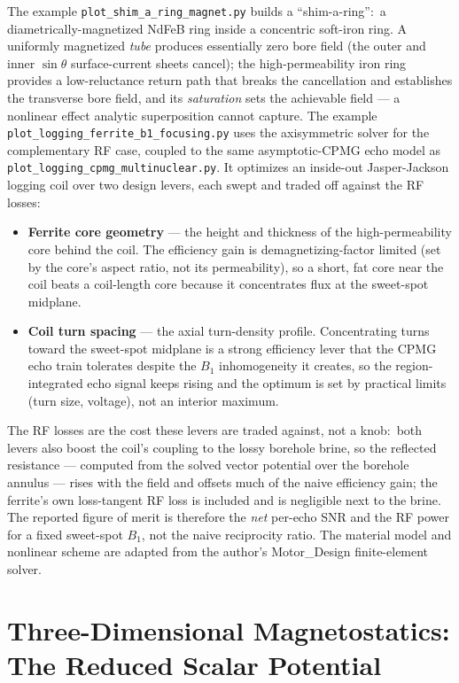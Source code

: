 \documentclass[11pt,oneside]{report}
\newcommand{\code}[1]{\texttt{#1}}
\begin{document}
The example \code{plot\_shim\_a\_ring\_magnet.py} builds a ``shim-a-ring'':\ a
diametrically-magnetized NdFeB ring inside a concentric soft-iron ring. A
uniformly magnetized \emph{tube} produces essentially zero bore field (the outer
and inner \(\sin\theta\) surface-current sheets cancel); the high-permeability
iron ring provides a low-reluctance return path that breaks the cancellation and
establishes the transverse bore field, and its \emph{saturation} sets the
achievable field --- a nonlinear effect analytic superposition cannot capture.
The example \code{plot\_logging\_ferrite\_b1\_focusing.py} uses the axisymmetric
solver for the complementary RF case, coupled to the same asymptotic-CPMG echo
model as \code{plot\_logging\_cpmg\_multinuclear.py}. It optimizes an inside-out
Jasper-Jackson logging coil over two design levers, each swept and traded off
against the RF losses:

\begin{itemize}
  \item \textbf{Ferrite core geometry} --- the height and thickness of the
  high-permeability core behind the coil. The efficiency gain is
  demagnetizing-factor limited (set by the core's aspect ratio, not its
  permeability), so a short, fat core near the coil beats a coil-length core
  because it concentrates flux at the sweet-spot midplane.
  \item \textbf{Coil turn spacing} --- the axial turn-density profile.
  Concentrating turns toward the sweet-spot midplane is a strong efficiency
  lever that the CPMG echo train tolerates despite the \(B_1\) inhomogeneity it
  creates, so the region-integrated echo signal keeps rising and the optimum is
  set by practical limits (turn size, voltage), not an interior maximum.
\end{itemize}

The RF losses are the cost these levers are traded against, not a knob:\ both
levers also boost the coil's coupling to the lossy borehole brine, so the
reflected resistance --- computed from the solved vector potential over the
borehole annulus --- rises with the field and offsets much of the naive
efficiency gain; the ferrite's own loss-tangent RF loss is included and is
negligible next to the brine. The reported figure of merit is therefore the
\emph{net} per-echo SNR and the RF power for a fixed sweet-spot \(B_1\), not the
naive reciprocity ratio. The material model and nonlinear scheme are adapted from
the author's Motor\_Design finite-element solver.

\section{Three-Dimensional Magnetostatics: The Reduced Scalar Potential}
\label{sec:fields-scalar-potential-3d}
\end{document}
